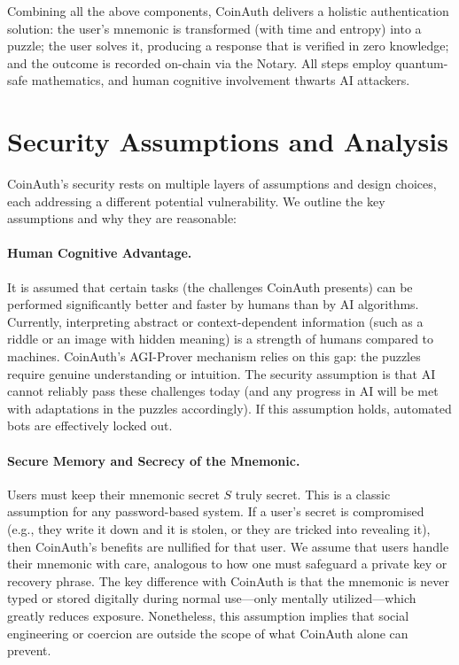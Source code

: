 \documentclass[10pt,letterpaper]{article}
\begin{document}
Combining all the above components, CoinAuth delivers a holistic authentication solution: the user’s mnemonic is transformed (with time and entropy) into a puzzle; the user solves it, producing a response that is verified in zero knowledge; and the outcome is recorded on-chain via the Notary. All steps employ quantum-safe mathematics, and human cognitive involvement thwarts AI attackers.

\section{Security Assumptions and Analysis}
CoinAuth’s security rests on multiple layers of assumptions and design choices, each addressing a different potential vulnerability. We outline the key assumptions and why they are reasonable:

\paragraph{Human Cognitive Advantage.} It is assumed that certain tasks (the challenges CoinAuth presents) can be performed significantly better and faster by humans than by AI algorithms. Currently, interpreting abstract or context-dependent information (such as a riddle or an image with hidden meaning) is a strength of humans compared to machines. CoinAuth’s AGI-Prover mechanism relies on this gap: the puzzles require genuine understanding or intuition. The security assumption is that AI cannot reliably pass these challenges today (and any progress in AI will be met with adaptations in the puzzles accordingly). If this assumption holds, automated bots are effectively locked out.

\paragraph{Secure Memory and Secrecy of the Mnemonic.} Users must keep their mnemonic secret \( S \) truly secret. This is a classic assumption for any password-based system. If a user’s secret is compromised (e.g., they write it down and it is stolen, or they are tricked into revealing it), then CoinAuth’s benefits are nullified for that user. We assume that users handle their mnemonic with care, analogous to how one must safeguard a private key or recovery phrase. The key difference with CoinAuth is that the mnemonic is never typed or stored digitally during normal use—only mentally utilized—which greatly reduces exposure. Nonetheless, this assumption implies that social engineering or coercion are outside the scope of what CoinAuth alone can prevent.
\end{document}
